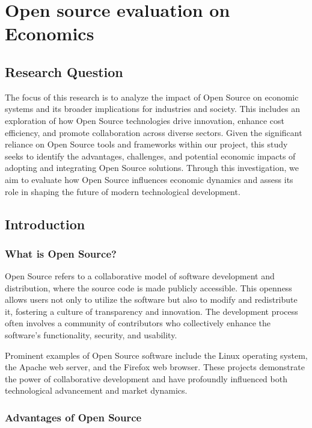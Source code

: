 \chapter{Open source evaluation on Economics}
\label{cha:Open_source_evaluation_Economics}

\section{Research Question}  
The focus of this research is to analyze the impact of Open Source on economic systems and its broader implications for industries and society. 
This includes an exploration of how Open Source technologies drive innovation, enhance cost efficiency, and promote collaboration across diverse sectors. 
Given the significant reliance on Open Source tools and frameworks within our project, this study seeks to identify the advantages, challenges, 
and potential economic impacts of adopting and integrating Open Source solutions. 
Through this investigation, we aim to evaluate how Open Source influences economic dynamics and assess its role in shaping the future of modern technological development.

\section{Introduction}

\subsection{What is Open Source?}

Open Source refers to a collaborative model of software development and distribution, where the source code is made publicly accessible. 
This openness allows users not only to utilize the software but also to modify and redistribute it, fostering a culture of transparency and innovation. 
The development process often involves a community of contributors who collectively enhance the software's functionality, security, and usability.

Prominent examples of Open Source software include the Linux operating system, the Apache web server, and the Firefox web browser. 
These projects demonstrate the power of collaborative development and have profoundly influenced both technological advancement and market dynamics.

\subsection{Advantages of Open Source}

